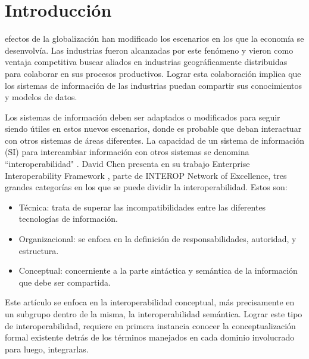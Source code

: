 \documentclass[journal]{IEEEtran}
\begin{document}
\section{Introducci\'on}
% 
% 
% 
% 
 efectos de la globalizaci\'on han modificado los escenarios en los que la econom\'ia se desenvolv\'ia. Las industrias fueron alcanzadas por este fen\'omeno y vieron como ventaja competitiva buscar aliados en industrias geogr\'aficamente distribuidas para colaborar en sus procesos productivos. Lograr esta colaboraci\'on implica que los sistemas de informaci\'on de las industrias puedan compartir sus conocimientos y modelos de datos. 

Los sistemas de informaci\'on deben ser adaptados o modificados para seguir siendo \'utiles en estos nuevos escenarios, donde es probable que deban interactuar con otros sistemas de \'areas diferentes. La capacidad de un sistema de informaci\'on (SI) para intercambiar informaci\'on con otros sistemas se denomina ``interoperabilidad" \cite{Ray2006}. David Chen presenta en su trabajo Enterprise Interoperability Framework \cite{Sinderen2011}, parte de INTEROP Network of Excellence, tres grandes categor\'ias en los que se puede dividir la interoperabilidad. Estos son:

\begin{itemize}
\item T\'ecnica: trata de superar las incompatibilidades entre las diferentes tecnolog\'ias de informaci\'on.  
\item Organizacional: se enfoca en la definici\'on de responsabilidades, autoridad, y estructura. 
\item Conceptual: concerniente a la parte sint\'actica y sem\'antica de la informaci\'on que debe ser compartida.
\end{itemize}

Este art\'iculo se enfoca en la interoperabilidad conceptual, m\'as precisamente en un subgrupo dentro de la misma, la interoperabilidad sem\'antica. Lograr este tipo de interoperabilidad, requiere en primera instancia conocer la conceptualizaci\'on formal existente detr\'as de los t\'erminos manejados en cada dominio involucrado para luego, integrarlas.
\end{document}
